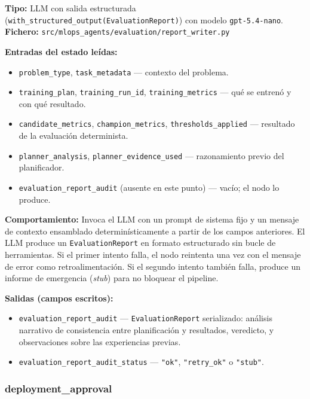 \textbf{Tipo:} LLM con salida estructurada (\texttt{with\_structured\_output(EvaluationReport)}) con modelo \texttt{gpt-5.4-nano}.\\
\textbf{Fichero:} \texttt{src/mlops\_agents/evaluation/report\_writer.py}

\textbf{Entradas del estado leídas:}
\begin{itemize}
  \item \texttt{problem\_type}, \texttt{task\_metadata} — contexto del problema.
  \item \texttt{training\_plan}, \texttt{training\_run\_id}, \texttt{training\_metrics} — qué se entrenó y con qué resultado.
  \item \texttt{candidate\_metrics}, \texttt{champion\_metrics}, \texttt{thresholds\_applied} — resultado de la evaluación determinista.
  \item \texttt{planner\_analysis}, \texttt{planner\_evidence\_used} — razonamiento previo del planificador.
  \item \texttt{evaluation\_report\_audit} (ausente en este punto) — vacío; el nodo lo produce.
\end{itemize}

\textbf{Comportamiento:} Invoca el LLM con un prompt de sistema fijo y un mensaje de contexto ensamblado determinísticamente a partir de los campos anteriores. El LLM produce un \texttt{EvaluationReport} en formato estructurado sin bucle de herramientas. Si el primer intento falla, el nodo reintenta una vez con el mensaje de error como retroalimentación. Si el segundo intento también falla, produce un informe de emergencia (\emph{stub}) para no bloquear el pipeline.

\textbf{Salidas (campos escritos):}
\begin{itemize}
  \item \texttt{evaluation\_report\_audit} — \texttt{EvaluationReport} serializado: análisis narrativo de consistencia entre planificación y resultados, veredicto, y observaciones sobre las experiencias previas.
  \item \texttt{evaluation\_report\_audit\_status} — \texttt{"ok"}, \texttt{"retry\_ok"} o \texttt{"stub"}.
\end{itemize}

\subsubsection*{deployment\_approval}
\label{sec:nodo-gate2}

